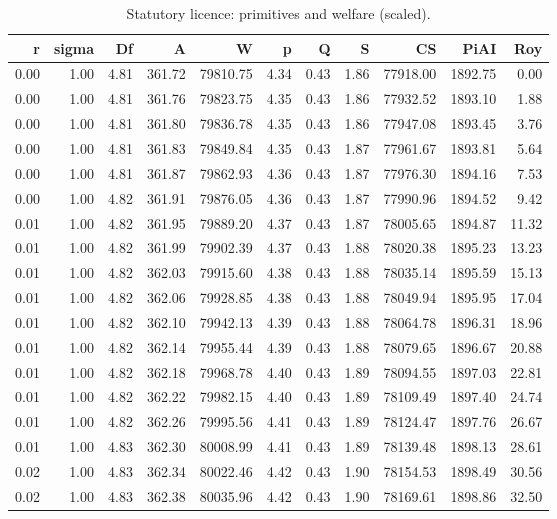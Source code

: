 \begin{table}[!ht]
\centering
\caption{Statutory licence: primitives and welfare (scaled).}
\label{tab:statutory}
\begin{tabular}{rrrrrrrrrrr}
\toprule
r & sigma & Df & A & W & p & Q & S & CS & PiAI & Roy \\
\midrule
0.00 & 1.00 & 4.81 & 361.72 & 79810.75 & 4.34 & 0.43 & 1.86 & 77918.00 & 1892.75 & 0.00 \\
0.00 & 1.00 & 4.81 & 361.76 & 79823.75 & 4.35 & 0.43 & 1.86 & 77932.52 & 1893.10 & 1.88 \\
0.00 & 1.00 & 4.81 & 361.80 & 79836.78 & 4.35 & 0.43 & 1.86 & 77947.08 & 1893.45 & 3.76 \\
0.00 & 1.00 & 4.81 & 361.83 & 79849.84 & 4.35 & 0.43 & 1.87 & 77961.67 & 1893.81 & 5.64 \\
0.00 & 1.00 & 4.81 & 361.87 & 79862.93 & 4.36 & 0.43 & 1.87 & 77976.30 & 1894.16 & 7.53 \\
0.00 & 1.00 & 4.82 & 361.91 & 79876.05 & 4.36 & 0.43 & 1.87 & 77990.96 & 1894.52 & 9.42 \\
0.01 & 1.00 & 4.82 & 361.95 & 79889.20 & 4.37 & 0.43 & 1.87 & 78005.65 & 1894.87 & 11.32 \\
0.01 & 1.00 & 4.82 & 361.99 & 79902.39 & 4.37 & 0.43 & 1.88 & 78020.38 & 1895.23 & 13.23 \\
0.01 & 1.00 & 4.82 & 362.03 & 79915.60 & 4.38 & 0.43 & 1.88 & 78035.14 & 1895.59 & 15.13 \\
0.01 & 1.00 & 4.82 & 362.06 & 79928.85 & 4.38 & 0.43 & 1.88 & 78049.94 & 1895.95 & 17.04 \\
0.01 & 1.00 & 4.82 & 362.10 & 79942.13 & 4.39 & 0.43 & 1.88 & 78064.78 & 1896.31 & 18.96 \\
0.01 & 1.00 & 4.82 & 362.14 & 79955.44 & 4.39 & 0.43 & 1.88 & 78079.65 & 1896.67 & 20.88 \\
0.01 & 1.00 & 4.82 & 362.18 & 79968.78 & 4.40 & 0.43 & 1.89 & 78094.55 & 1897.03 & 22.81 \\
0.01 & 1.00 & 4.82 & 362.22 & 79982.15 & 4.40 & 0.43 & 1.89 & 78109.49 & 1897.40 & 24.74 \\
0.01 & 1.00 & 4.82 & 362.26 & 79995.56 & 4.41 & 0.43 & 1.89 & 78124.47 & 1897.76 & 26.67 \\
0.01 & 1.00 & 4.83 & 362.30 & 80008.99 & 4.41 & 0.43 & 1.89 & 78139.48 & 1898.13 & 28.61 \\
0.02 & 1.00 & 4.83 & 362.34 & 80022.46 & 4.42 & 0.43 & 1.90 & 78154.53 & 1898.49 & 30.56 \\
0.02 & 1.00 & 4.83 & 362.38 & 80035.96 & 4.42 & 0.43 & 1.90 & 78169.61 & 1898.86 & 32.50 \\

\end{tabular}
\end{table}
